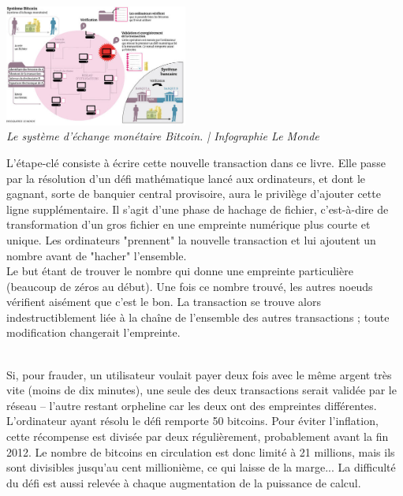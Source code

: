 \documentclass[11pt,twoside,a4paper]{article}
\begin{document}
\begin{minipage}[ht]{6.25cm}	
	\includegraphics[width=6.00cm]{img/1798255_5_2076_le-systeme-d-echange-monetaire-bitcoin_f2e60fed9a4542a2589e1e9e6317fcdc.jpg} ~\\
	\emph{Le syst{\`e}me d'{\'e}change mon{\'e}taire Bitcoin. | Infographie Le Monde}~\\
\end{minipage} \hfill \begin{minipage}[ht]{12.50cm}
	L'{\'e}tape-cl{\'e} consiste {\`a} {\'e}crire cette nouvelle transaction dans ce livre. Elle passe par la r{\'e}solution d'un d{\'e}fi math{\'e}matique lanc{\'e} aux ordinateurs, et dont le gagnant, sorte de banquier central provisoire, aura le privil{\`e}ge d'ajouter cette ligne suppl{\'e}mentaire. Il s'agit d'une phase de hachage de fichier, c'est-{\`a}-dire de transformation d'un gros fichier en une empreinte num{\'e}rique plus courte et unique. Les ordinateurs "prennent" la nouvelle transaction et lui ajoutent un nombre avant de "hacher" l'ensemble. ~\\
	
	Le but {\'e}tant de trouver le nombre qui donne une empreinte particuli{\`e}re (beaucoup de z{\'e}ros au d{\'e}but). Une fois ce nombre trouv{\'e}, les autres noeuds v{\'e}rifient ais{\'e}ment que c'est le bon. La transaction se trouve alors indestructiblement li{\'e}e {\`a} la cha{\^i}ne de l'ensemble des autres transactions ; toute modification changerait l'empreinte. ~\\
\end{minipage}~\\

Si, pour frauder, un utilisateur voulait payer deux fois avec le m{\^e}me argent tr{\`e}s vite (moins de dix minutes), une seule des deux transactions serait valid{\'e}e par le r{\'e}seau -- l'autre restant orpheline car les deux ont des empreintes diff{\'e}rentes. L'ordinateur ayant r{\'e}solu le d{\'e}fi remporte 50 bitcoins. Pour {\'e}viter l'inflation, cette r{\'e}compense est divis{\'e}e par deux r{\'e}guli{\`e}rement, probablement avant la fin 2012. Le nombre de bitcoins en circulation est donc limit{\'e} {\`a} 21 millions, mais ils sont divisibles jusqu'au cent millioni{\`e}me, ce qui laisse de la marge... La difficult{\'e} du d{\'e}fi est aussi relev{\'e}e {\`a} chaque augmentation de la puissance de calcul. ~\\
\end{document}

